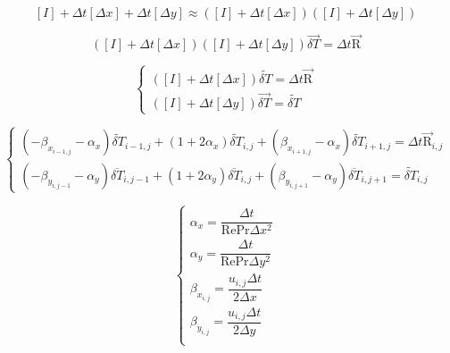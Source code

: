 \documentclass{article}
\begin{document}
\begin{equation}
\label{eq_approx_fac_1}
[I]+\Delta t [\Delta x] +\Delta t [\Delta y] \approx \left([I]+\Delta t [\Delta x]\right)([I]+\Delta t [\Delta y])
\end{equation}

\begin{equation}
\label{eq_delta_form_12}
\left([I]+\Delta t [\Delta x]\right)([I]+\Delta t [\Delta y]) \overrightarrow{\delta T}= \Delta t \overrightarrow{\text{R}}
\end{equation}

\begin{equation}
\label{eq_decom_12}
\begin{cases}
\left([I]+\Delta t [\Delta x]\right) \widetilde{\delta T}= \Delta t \overrightarrow{\text{R}} \\[10 pt]
([I]+\Delta t [\Delta y]) \overrightarrow{\delta T}= \widetilde{\delta T}
\end{cases}
\end{equation}

\begin{equation}
\label{eq_main_7878}
\begin{cases}
(-\beta_{x_{i-1,j}}-\alpha_x) \widetilde{\delta T}_{i-1,j} +(1+2\alpha_x)\widetilde{\delta T}_{i,j}    +(\beta_{x_{i+1,j}}-\alpha_x) \widetilde{\delta T}_{i+1,j}     =\Delta t \overrightarrow{\text{R}}_{i,j}  \\[10 pt]
(-\beta_{y_{i,j-1}}-\alpha_y) \overline{\delta T}_{i,j-1} +(1+2\alpha_y)\overline{\delta T}_{i,j}    +(\beta_{y_{i,j+1}}-\alpha_y) \overline{\delta T}_{i,j+1}     =\widetilde{\delta T}_{i,j}
\end{cases}
\end{equation}

\begin{equation}
\label{eq_alpha_beta_1}
\begin{cases}
\alpha_x=\dfrac{\Delta t}{\text{Re}\text{Pr} \Delta x^2} \\[10 pt]
\alpha_y=\dfrac{\Delta t}{\text{Re}\text{Pr} \Delta y^2} \\[10 pt]
\beta_{x_{i,j}}=\dfrac{u_{i,j} \Delta t}{2 \Delta x} \\[10 pt]
\beta_{y_{i,j}}=\dfrac{u_{i,j} \Delta t}{2 \Delta y} \\
\end{cases}
\end{equation}
\end{document}
